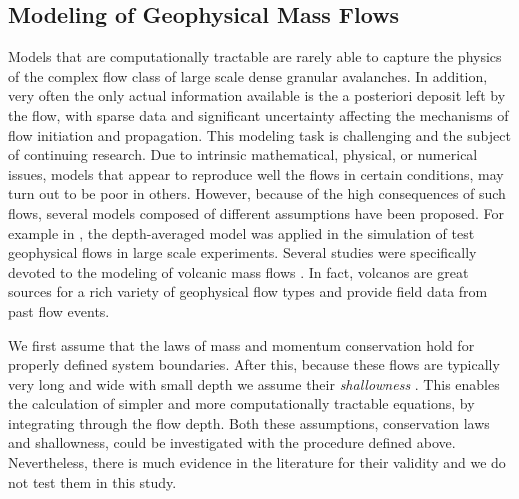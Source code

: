 \documentclass{article}
\begin{document}
\subsection{Modeling of Geophysical Mass Flows}\label{subsec:FlowTypes}
Models that are computationally tractable are rarely able to capture the physics of the complex flow class of large scale dense granular avalanches. In addition, very often the only actual information available is the a posteriori deposit left by the flow, with sparse data and significant uncertainty affecting the mechanisms of flow initiation and propagation. This modeling task is challenging and the subject of continuing research. Due to intrinsic mathematical, physical, or numerical issues, models that appear to reproduce well the flows in certain conditions, may turn out to be poor in others. However, because of the high consequences of such flows, several models composed of different assumptions have been proposed. For example in \citep{Iverson1997, Iverson2001, Denlinger2001, Pitman2003a, Denlinger2004, Iverson2004,dMichieliVitturi2019}, the depth-averaged model was applied in the simulation of test geophysical flows in large scale experiments. Several studies were specifically devoted to the modeling of volcanic mass flows \citep{Bursik2005,Kelfoun2005,Macias2008,Kelfoun2009,Charbonnier2013}. In fact, volcanos are great sources for a rich variety of geophysical flow types and provide field data from past flow events.

We first assume that the laws of mass and momentum conservation hold for properly defined system boundaries. After this, because these flows are typically very long and wide with small depth we assume their {\it shallowness} \citep{SavageHutter1989}. This enables the calculation of simpler and more computationally tractable equations, by integrating through the flow depth. Both these assumptions, conservation laws and shallowness, could be investigated with the procedure defined above. Nevertheless, there is much evidence in the literature for their validity and we do not test them in this study.
\end{document}
